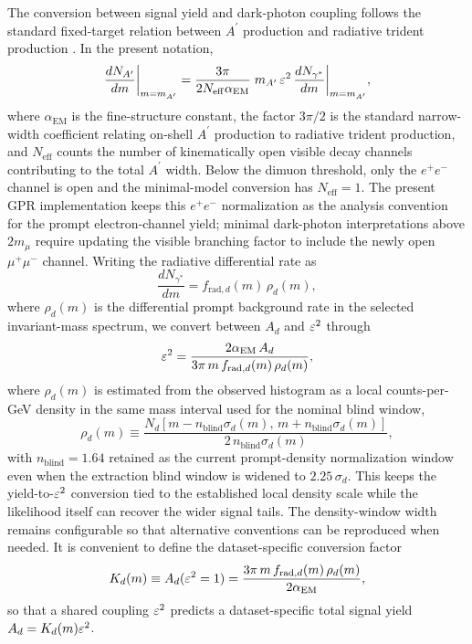 The conversion between signal yield and dark-photon coupling follows the standard
fixed-target relation between $A^\prime$ production and radiative trident production
\cite{EssigEtAl2011,HPS2015DarkPhoton,HPS2016PromptLong}. In the present notation,
\begin{equation}
\frac{dN_{A^\prime}}{dm}\bigg|_{m=m_{A^\prime}}
= \frac{3\pi}{2N_{\mathrm{eff}}\alpha_{\mathrm{EM}}}
\; m_{A^\prime}\,\varepsilon^2\,
\frac{dN_{\gamma^\ast}}{dm}\bigg|_{m=m_{A^\prime}},
\end{equation}
where $\alpha_{\mathrm{EM}}$ is the fine-structure constant, the factor $3\pi/2$ is the
standard narrow-width coefficient relating on-shell $A^\prime$ production to radiative
trident production, and $N_{\mathrm{eff}}$ counts the number of kinematically open
visible decay channels contributing to the total $A^\prime$ width. Below the dimuon
threshold, only the $e^+e^-$ channel is open and the minimal-model conversion has
$N_{\mathrm{eff}}=1$. The present GPR implementation keeps this $e^+e^-$ normalization
as the analysis convention for the prompt electron-channel yield; minimal dark-photon
interpretations above $2m_\mu$ require updating the visible branching factor to include
the newly open $\mu^+\mu^-$ channel. Writing the
radiative differential rate as
\begin{equation}
\frac{dN_{\gamma^\ast}}{dm}
= f_{\mathrm{rad},d}(m)\,\rho_d(m),
\end{equation}
where $\rho_d(m)$ is the differential prompt background rate in the selected
invariant-mass spectrum, we convert between $A_d$ and $\varepsilon^2$ through
\begin{equation}
\varepsilon^2 =
\frac{2\alpha_{\mathrm{EM}}\,A_d}
{3\pi\,m\,f_{\mathrm{rad},d}(m)\,\rho_d(m)},
\label{eq:eps2-conversion}
\end{equation}
where $\rho_d(m)$ is estimated from the observed histogram as a local counts-per-GeV
density in the same mass interval used for the nominal blind window,
\begin{equation}
\rho_d(m)\equiv
\frac{N_d\!\left[m-n_{\mathrm{blind}}\sigma_d(m),\,m+n_{\mathrm{blind}}\sigma_d(m)\right]}
{2\,n_{\mathrm{blind}}\sigma_d(m)},
\end{equation}
with $n_{\mathrm{blind}}=1.64$ retained as the current prompt-density normalization
window even when the extraction blind window is widened to $2.25\,\sigma_d$. This keeps
the yield-to-$\varepsilon^2$ conversion tied to the established local density scale while
the likelihood itself can recover the wider signal tails. The density-window width
remains configurable so that alternative conventions can be reproduced when needed.
It is convenient to define the
dataset-specific conversion factor
\begin{equation}
K_d(m) \equiv A_d(\varepsilon^2 = 1)
= \frac{3\pi\,m\,f_{\mathrm{rad},d}(m)\,\rho_d(m)}{2\alpha_{\mathrm{EM}}},
\label{eq:Kd-conversion}
\end{equation}
so that a shared coupling $\varepsilon^2$ predicts a dataset-specific total signal yield
$A_d = K_d(m)\varepsilon^2$.

